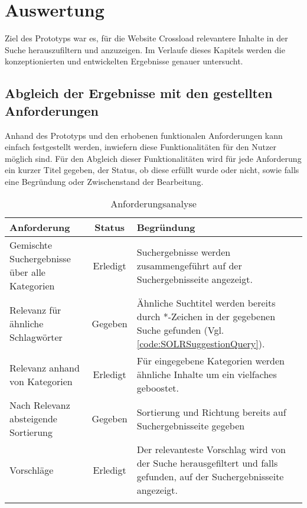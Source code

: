 \chapter{Auswertung}
\label{ch:evaluation}
Ziel des Prototyps war es, für die Website Crossload relevantere Inhalte in der Suche herauszufiltern und anzuzeigen.
Im Verlaufe dieses Kapitels werden die konzeptionierten und entwickelten Ergebnisse genauer untersucht.

\section{Abgleich der Ergebnisse mit den gestellten Anforderungen}
\label{sec:reviewRequirements}
Anhand des Prototyps und den erhobenen funktionalen Anforderungen kann einfach festgestellt werden, inwiefern diese Funktionalitäten für den Nutzer möglich sind.
Für den Abgleich dieser Funktionalitäten wird für jede Anforderung ein kurzer Titel gegeben, der Status, ob diese erfüllt wurde oder nicht, sowie falls eine Begründung oder Zwischenstand der Bearbeitung.

\begin{longtable}{p{}|c|p{}}
  \label{tab:requirements}\\
  \textbf{Anforderung} & \textbf{Status} & \textbf{Begründung} \\
  \hline
  \hline
  Gemischte Suchergebnisse über alle Kategorien & Erledigt & Suchergebnisse werden zusammengeführt auf der Suchergebnisseite angezeigt. \\
  \hline

  Relevanz für ähnliche Schlagwörter & Gegeben & Ähnliche Suchtitel werden bereits durch *-Zeichen in der gegebenen Suche gefunden (Vgl. \ref{code:SOLRSuggestionQuery}). \\
  \hline

  Relevanz anhand von Kategorien & Erledigt & Für eingegebene Kategorien werden ähnliche Inhalte um ein vielfaches geboostet. \\
  \hline

  Nach Relevanz absteigende Sortierung & Gegeben & Sortierung und Richtung bereits auf Suchergebnisseite gegeben \\
  \hline

  Vorschläge & Erledigt & Der relevanteste Vorschlag wird von der Suche herausgefiltert und falls gefunden, auf der Suchergebnisseite angezeigt. \\
  \caption{Anforderungsanalyse}
\end{longtable}

